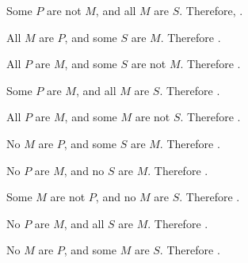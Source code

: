 \begin{exercises}
\item Some $P$ are not $M$, and all $M$ are $S$. Therefore, \underline{\hspace{2cm}}.

\item All $M$ are $P$, and some $S$ are $M$. Therefore \underline{\hspace{2cm}}.

\item All $P$ are $M$, and some $S$ are not $M$. Therefore \underline{\hspace{2cm}}.

\item Some $P$ are $M$, and all $M$ are $S$. Therefore \underline{\hspace{2cm}}.

\item All $P$ are $M$, and some $M$ are not $S$. Therefore \underline{\hspace{2cm}}.

\item No $M$ are $P$, and some $S$ are $M$. Therefore \underline{\hspace{2cm}}.

\item No $P$ are $M$, and no $S$ are $M$. Therefore \underline{\hspace{2cm}}.

\item Some $M$ are not $P$, and no $M$ are $S$. Therefore \underline{\hspace{2cm}}.

\item No $P$ are $M$, and all $S$ are $M$. Therefore \underline{\hspace{2cm}}.

\item No $M$ are $P$, and some $M$ are $S$. Therefore \underline{\hspace{2cm}}.

\end{exercises}


